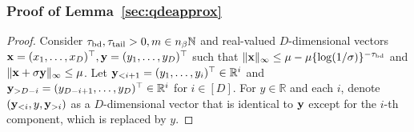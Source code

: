 \documentclass[twoside,11pt]{article}
\newcommand{\bx}{{\bf x}}
\newcommand{\by}{{\bf y}}
\newcommand{\bbR}{{\mathbb R}}
\newcommand{\bbN}{{\mathbb N}}
\begin{document}
\subsubsection{Proof of Lemma~\ref{sec:qdeapprox}}

\begin{proof}
Consider $\tau_{\rm bd},\tau_{\rm tail} > 0, m \in n_{\beta} \bbN$ and
real-valued $D$-dimensional vectors $\bx = (x_1,\ldots,x_{D})^{\top}, \by = (y_1,\ldots,y_{D})^{\top}$ such that $\| \bx \|_{\infty} \leq \mu - \mu\{\log(1/\sigma)\}^{-\tau_{\rm bd}} $ and  $\|\bx +\sigma \by \|_{\infty} \leq \mu$.
Let $\by_{<i+1} =  (y_1,\ldots,y_{i})^{\top} \in \bbR^{i}$ and $\by_{>D-i} =(y_{D-i+1},\ldots,y_{D})^{\top} \in \bbR^{i}$ for $i \in [D]$.
For $y \in \bbR$ and each $i$, denote $(\by_{<i},y,\by_{>i})$ as a $D$-dimensional vector that is identical to $\by$ except for the $i$-th component, which is replaced by $y$.



\end{proof}
\end{document}
